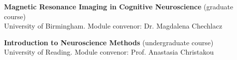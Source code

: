 	{\textbf{Magnetic Resonance Imaging in Cognitive Neuroscience} (graduate course) \\
	University of Birmingham. Module convenor: Dr. Magdalena Chechlacz}

	{\textbf{Introduction to Neuroscience Methods} (undergraduate course) \\
	University of Reading. Module convenor: Prof. Anastasia Christakou}
